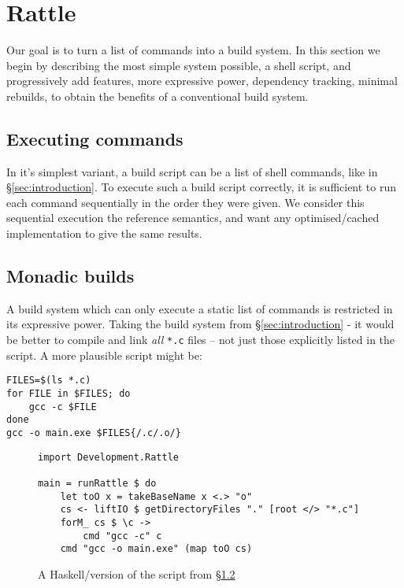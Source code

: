 \section{Rattle}
\label{sec:rattle}

Our goal is to turn a list of commands into a build system.  In this section we begin by describing the most simple system possible, a shell script, and progressively add features, more expressive power, dependency tracking, minimal rebuilds, to obtain the benefits of a conventional build system.


\subsection{Executing commands}

In it's simplest variant, a build script can be a list of shell commands, like in \S\ref{sec:introduction}.  To execute such a build script correctly, it is sufficient to run each command sequentially in the order they were given. We consider this sequential execution the reference semantics, and want any optimised/cached implementation to give the same results.

\subsection{Monadic builds}
\label{sec:monadic}

A build system which can only execute a static list of commands is restricted in its expressive power. Taking the build system from \S\ref{sec:introduction} - it would be better to compile and link \emph{all} \texttt{*.c} files -- not just those explicitly listed in the script. A more plausible script might be:

\vspace{3mm}
\begin{verbatim}
FILES=$(ls *.c)
for FILE in $FILES; do
    gcc -c $FILE
done
gcc -o main.exe $FILES{/.c/.o/}
\end{verbatim}
\vspace{3mm}

\begin{figure}
\begin{verbatim}
import Development.Rattle

main = runRattle $ do
    let toO x = takeBaseName x <.> "o"
    cs <- liftIO $ getDirectoryFiles "." [root </> "*.c"]
    forM_ cs $ \c ->
        cmd "gcc -c" c
    cmd "gcc -o main.exe" (map toO cs)
\end{verbatim}
\caption{A Haskell/\Rattle version of the script from \S\ref{sec:monadic}}
\label{fig:monadic}
\end{figure}

